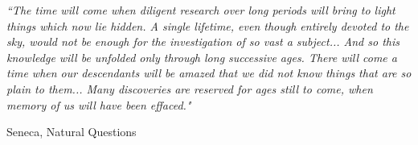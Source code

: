 \documentclass[11pt, oneside]{Thesis} %
\begin{document}

\pagestyle{empty} %

\null\vfill %

\textit{``The time will come when diligent research over long periods will bring to light things which now lie hidden. A single lifetime, even though entirely devoted to the sky, would not be enough for the investigation of so vast a subject... And so this knowledge will be unfolded only through long successive ages. There will come a time when our descendants will be amazed that we did not know things that are so plain to them... Many discoveries are reserved for ages still to come, when memory of us will have been effaced."}

\begin{flushright}
Seneca, Natural Questions 
\end{flushright}

\vfill\vfill\vfill\vfill\vfill\vfill\null %

\clearpage %


\pagestyle{fancy} %

\tableofcontents %
\clearpage %





\pagestyle{fancy} %
\end{document}
